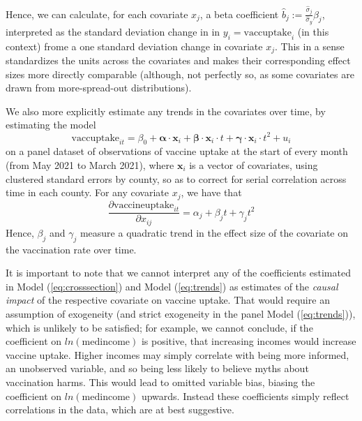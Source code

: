 \documentclass[12pt]{article}
\begin{document}
\begin{spacing}{1.5}
		Hence, we can calculate, for each covariate $x_j$, a beta coefficient $\hat{b}_j := \frac{\hat{\sigma}_j}{\hat{\sigma}_y}\beta_j$, interpreted as the standard deviation change in in $y_i=\textrm{vaccuptake}_i$ (in this context) frome a one standard deviation change in covariate $x_j$. This in a sense standardizes the units across the covariates and makes their corresponding effect sizes more directly comparable (although, not perfectly so, as some covariates are drawn from more-spread-out distributions).
		
		We also more explicitly estimate any trends in the covariates over time, by estimating the model
		\begin{equation}
			\textrm{vaccuptake}_{it} =  \beta_0 + \boldsymbol{\alpha}\cdot\mathbf{x}_{i} + \boldsymbol{\beta}\cdot\mathbf{x}_{i}\cdot t + \boldsymbol{\gamma}\cdot\mathbf{x}_{i}\cdot t^2 + u_i
		\end{equation}
		on a panel dataset of observations of vaccine uptake at the start of every month (from May 2021 to March 2021), where $\mathbf{x}_{i}$ is a vector of covariates, using clustered standard errors by county, so as to correct for serial correlation across time in each county. For any covariate $x_j$, we have that
		\begin{equation} \label{eq:trends}
			\frac{\partial \textrm{vaccineuptake}_{it}}{\partial x_{ij}} = \alpha_j + \beta_jt + \gamma_jt^2
		\end{equation}
		Hence, $\beta_j$ and $\gamma_j$ measure a quadratic trend in the effect size of the covariate on the vaccination rate over time.
		
		
		It is important to note that we cannot interpret any of the coefficients estimated in Model (\ref{eq:crosssection}) and Model (\ref{eq:trends})  as estimates of the \textit{causal impact} of the respective covariate on vaccine uptake. That would require an assumption of exogeneity (and strict exogeneity in the panel Model (\ref{eq:trends})), which is unlikely to be satisfied; for example, we cannot conclude, if the coefficient on $ln(\textrm{medincome})$ is positive, that increasing incomes would increase vaccine uptake. Higher incomes may simply correlate with being more informed, an unobserved variable, and so being less likely to believe myths about vaccination harms. This would lead to omitted variable bias, biasing the coefficient on $ln(\textrm{medincome})$ upwards. Instead these coefficients simply reflect correlations in the data, which are at best suggestive.
		

\end{spacing}
\end{document}
